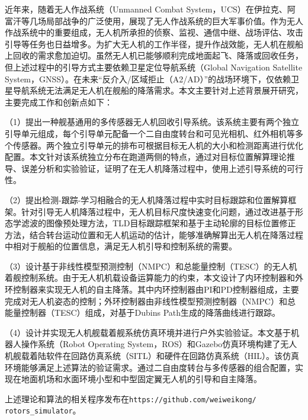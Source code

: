 \begin{cabstract}
近年来，随着无人作战系统（Unmanned Combat System，UCS）在伊拉克、阿富汗等几场局部战争的广泛使用，展现了无人作战系统的巨大军事价值。作为无人作战系统中的重要组成，无人机所承担的侦察、监视、通信中继、战场评估、攻击引导等任务也日益增多。为扩大无人机的工作半径，提升作战效能，无人机在舰船上回收的需求愈加迫切。虽然无人机已能够顺利完成地面起飞、降落或回收任务，但上述过程中的引导方式主要依赖卫星定位导航系统（Global Navigation Satellite System，GNSS）。在未来“反介入/区域拒止（A2/AD）”的战场环境下，仅依赖卫星导航系统无法满足无人机在舰船的降落需求。本文主要针对上述背景展开研究，主要完成工作和创新点如下：

（1）提出一种舰基通用的多传感器无人机回收引导系统。该系统主要有两个独立引导单元组成，每个引导单元配备一个二自由度转台和可见光相机、红外相机等多个传感器。两个独立引导单元的排布可根据目标无人机的大小和检测距离进行优化配置。本文针对该系统独立分布在跑道两侧的特点，通过对目标位置解算理论推导、误差分析和实验验证，证明了在无人机降落过程中，使用上述引导系统的可行性。

（2）提出检测-跟踪-学习相融合的无人机降落过程中实时目标跟踪和位置解算框架。针对引导无人机降落过程中，无人机目标尺度快速变化问题，通过改进基于形态学滤波的图像预处理方法，TLD目标跟踪框架和基于主动轮廓的目标位置修正方法，结合转台运动位置和无人机运动的估计，能够准确解算出无人机在降落过程中相对于舰船的位置信息，满足无人机引导和控制系统的需要。

（3）设计基于非线性模型预测控制（NMPC）和总能量控制（TESC）的无人机着舰控制系统。由于无人机机载设备运算能力的约束，本文设计了内环控制器和外环控制器来实现无人机的自主降落。其中内环控制器由PI和PD控制器组成，主要完成对无人机姿态的控制；外环控制器由非线性模型预测控制器（NMPC）和总能量控制器（TESC）组成，对基于Dubins Path生成的降落曲线进行跟踪。

（4）设计并实现无人机舰载着舰系统仿真环境并进行户外实验验证。本文基于机器人操作系统（Robot Operating System，ROS）和Gazebo仿真环境构建了无人机舰载着陆软件在回路仿真系统（SITL）和硬件在回路仿真系统（HIL）。该仿真环境能够满足上述算法的验证需求。通过二自由度转台与多传感器的组合配置，实现在地面机场和水面环境小型和中型固定翼无人机的引导和自主降落。

上述理论和算法的相关程序发布在\texttt{https://github.com/weiweikong/\\rotors\_simulator}。

\end{cabstract}

